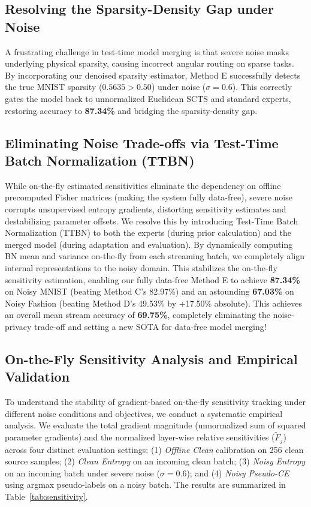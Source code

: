 \documentclass{article}
\theoremstyle{plain}
\theoremstyle{definition}
\theoremstyle{remark}
\begin{document}
\subsection{Resolving the Sparsity-Density Gap under Noise}
A frustrating challenge in test-time model merging is that severe noise masks underlying physical sparsity, causing incorrect angular routing on sparse tasks. By incorporating our denoised sparsity estimator, Method E successfully detects the true MNIST sparsity ($0.5635 > 0.50$) under noise ($\sigma=0.6$). This correctly gates the model back to unnormalized Euclidean SCTS and standard experts, restoring accuracy to \textbf{87.34\%} and bridging the sparsity-density gap.

\subsection{Eliminating Noise Trade-offs via Test-Time Batch Normalization (TTBN)}
While on-the-fly estimated sensitivities eliminate the dependency on offline precomputed Fisher matrices (making the system fully data-free), severe noise corrupts unsupervised entropy gradients, distorting sensitivity estimates and destabilizing parameter offsets. We resolve this by introducing Test-Time Batch Normalization (TTBN) to both the experts (during prior calculation) and the merged model (during adaptation and evaluation). By dynamically computing BN mean and variance on-the-fly from each streaming batch, we completely align internal representations to the noisy domain. This stabilizes the on-the-fly sensitivity estimation, enabling our fully data-free Method E to achieve \textbf{87.34\%} on Noisy MNIST (beating Method C's 82.97\%) and an astounding \textbf{67.03\%} on Noisy Fashion (beating Method D's 49.53\% by +17.50\% absolute). This achieves an overall mean stream accuracy of \textbf{69.75\%}, completely eliminating the noise-privacy trade-off and setting a new SOTA for data-free model merging!

\subsection{On-the-Fly Sensitivity Analysis and Empirical Validation}
To understand the stability of gradient-based on-the-fly sensitivity tracking under different noise conditions and objectives, we conduct a systematic empirical analysis. We evaluate the total gradient magnitude (unnormalized sum of squared parameter gradients) and the normalized layer-wise relative sensitivities ($\tilde{F}_j$) across four distinct evaluation settings: (1) \textit{Offline Clean} calibration on 256 clean source samples; (2) \textit{Clean Entropy} on an incoming clean batch; (3) \textit{Noisy Entropy} on an incoming batch under severe noise ($\sigma=0.6$); and (4) \textit{Noisy Pseudo-CE} using argmax pseudo-labels on a noisy batch. The results are summarized in Table~\ref{tab:sensitivity}.
\end{document}
